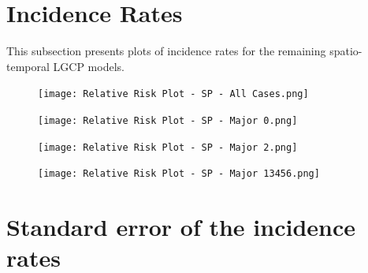 \begin{appendices}
    \newpage


\section{Incidence Rates} \label{app:incidence-rates}

    This subsection presents plots of incidence rates for the remaining spatio-temporal LGCP models.

    \begin{figure}[H]
        \begin{center}
            \texttt{[image: Relative Risk Plot - SP - All Cases.png]}
        \end{center}
    \end{figure}

    \begin{figure}[H]
        \begin{center}
            \texttt{[image: Relative Risk Plot - SP - Major 0.png]}
        \end{center}
    \end{figure}

    \begin{figure}[H]
        \begin{center}
            \texttt{[image: Relative Risk Plot - SP - Major 2.png]}
        \end{center}
    \end{figure}

    \begin{figure}[H]
        \begin{center}
            \texttt{[image: Relative Risk Plot - SP - Major 13456.png]}
        \end{center}
    \end{figure}

    \newpage


\section{Standard error of the incidence rates}


\end{appendices}
